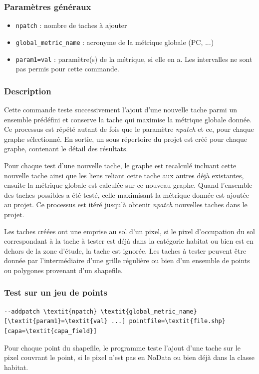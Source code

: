 \documentclass[a4paper,10pt]{report}
\begin{document}
\subsubsection{Paramètres généraux}
\begin{itemize}
	\item \verb|npatch| : nombre de taches à ajouter
	\item \verb|global_metric_name| : acronyme de la métrique globale (PC, ...)
	\item \verb|param1=val| : paramètre(s) de la métrique, si elle en a. Les intervalles ne sont pas permis pour cette commande.
\end{itemize}

\subsubsection{Description}
Cette commande teste successivement l'ajout d'une nouvelle tache parmi un ensemble prédéfini et conserve la tache qui maximise la métrique globale donnée. 
Ce processus est répété autant de fois que le paramètre \textit{npatch} et ce, pour chaque graphe sélectionné. 
En sortie, un sous répertoire du projet est créé pour chaque graphe, contenant le détail des résultats.

Pour chaque test d'une nouvelle tache, le graphe est recalculé incluant cette nouvelle tache ainsi que les liens reliant cette tache aux autres déjà existantes, ensuite la métrique globale est calculée sur ce nouveau graphe. Quand l'ensemble des taches possibles a été testé, celle maximisant la métrique donnée est ajoutée au projet. Ce processus est itéré jusqu'à obtenir \textit{npatch} nouvelles taches dans le projet.

Les taches créées ont une emprise au sol d'un pixel, si le pixel d'occupation du sol correspondant à la tache à tester est déjà dans la catégorie habitat ou bien est en dehors de la zone d'étude, la tache est ignorée. 
Les taches à tester peuvent être donnée par l'intermédiaire d'une grille régulière ou bien d'un ensemble de points ou polygones provenant d'un shapefile.

\subsubsection{Test sur un jeu de points}
\begin{Verbatim}[commandchars=\\\{\}]
--addpatch \textit{npatch} \textit{global_metric_name} [\textit{param1}=\textit{val} ...] pointfile=\textit{file.shp} [capa=\textit{capa_field}]
\end{Verbatim}
Pour chaque point du shapefile, le programme teste l'ajout d'une tache sur le pixel couvrant le point, si le pixel n'est pas en NoData ou bien déjà dans la classe habitat.
\end{document}
